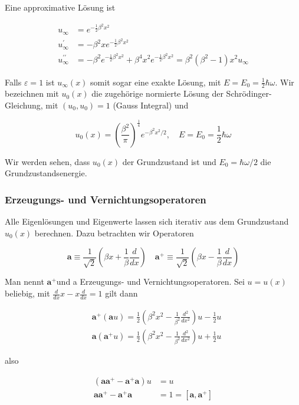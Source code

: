\documentclass[10pt, letterpaper]{article}
\begin{document}
Eine approximative Lösung ist

$$
\begin{aligned}
u_{\infty} & =e^{-\frac{1}{2} \beta^{2} x^{2}} \\
u_{\infty}^{\prime} & =-\beta^{2} x e^{-\frac{1}{2} \beta^{2} x^{2}} \\
u_{\infty}^{\prime \prime} & =-\beta^{2} e^{-\frac{1}{2} \beta^{2} x^{2}}+\beta^{4} x^{2} e^{-\frac{1}{2} \beta^{2} x^{2}}=\beta^{2}\left(\beta^{2}-1\right) x^{2} u_{\infty}
\end{aligned}
$$

Falls $\varepsilon=1$ ist $u_{\infty}(x)$ somit sogar eine exakte Lösung, mit $E=E_{0}=\frac{1}{2} \hbar \omega$. Wir bezeichnen mit $u_{0}(x)$ die zugehörige normierte Lösung der Schrödinger-Gleichung, mit $\left(u_{0}, u_{0}\right)=1$ (Gauss Integral) und

$$
u_{0}(x)=\left(\frac{\beta^{2}}{\pi}\right)^{\frac{1}{4}} e^{-\beta^{2} x^{2} / 2}, \quad E=E_{0}=\frac{1}{2} \hbar \omega
$$

Wir werden sehen, dass $u_{0}(x)$ der Grundzustand ist und $E_{0}=\hbar \omega / 2$ die Grundzustandsenergie.

\subsubsection*{Erzeugungs- und Vernichtungsoperatoren}
Alle Eigenlösungen und Eigenwerte lassen sich iterativ aus dem Grundzustand $u_{0}(x)$ berechnen. Dazu betrachten wir Operatoren

$$
\mathbf{a} \equiv \frac{1}{\sqrt{2}}\left(\beta x+\frac{1}{\beta} \frac{d}{d x}\right) \quad \mathbf{a}^{+} \equiv \frac{1}{\sqrt{2}}\left(\beta x-\frac{1}{\beta} \frac{d}{d x}\right)
$$

Man nennt $\mathbf{a}^{+}$und a Erzeugungs- und Vernichtungsoperatoren. Sei $u=u(x)$ beliebig, mit $\frac{d}{d x} x-x \frac{d}{d x}=1$ gilt dann

$$
\begin{aligned}
& \mathbf{a}^{+}(\mathbf{a} u)=\frac{1}{2}\left(\beta^{2} x^{2}-\frac{1}{\beta^{2}} \frac{d^{2}}{d x^{2}}\right) u-\frac{1}{2} u \\
& \mathbf{a}\left(\mathbf{a}^{+} u\right)=\frac{1}{2}\left(\beta^{2} x^{2}-\frac{1}{\beta^{2}} \frac{d^{2}}{d x^{2}}\right) u+\frac{1}{2} u
\end{aligned}
$$

also

$$
\begin{aligned}
\left(\mathbf{a} \mathbf{a}^{+}-\mathbf{a}^{+} \mathbf{a}\right) u & =u \\
\mathbf{a a}^{+}-\mathbf{a}^{+} \mathbf{a} & =1=\left[\mathbf{a}, \mathbf{a}^{+}\right]
\end{aligned}
$$
\end{document}
